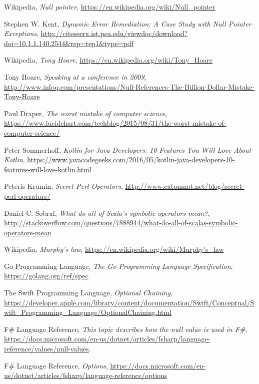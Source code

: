 \documentclass[11pt, a4paper]{report}
\begin{document}
\listoffigures

\begin{thebibliography}{100}
	
    Wikipedia,
    \emph{Null pointer},
    \url{https://en.wikipedia.org/wiki/Null_pointer}

    Stephen W. Kent,
    \textit{Dynamic Error Remediation: A Case Study with Null Pointer Exceptions},
    \url{http://citeseerx.ist.psu.edu/viewdoc/download?doi=10.1.1.140.2544&rep=rep1&type=pdf}

    Wikipedia,
    \textit{Tony Hoare},
    \url{https://en.wikipedia.org/wiki/Tony_Hoare}
    
    Tony Hoare,
    \textit{Speaking at a conference in 2009},
    \url{http://www.infoq.com/presentations/Null-References-The-Billion-Dollar-Mistake-Tony-Hoare}

    Paul Draper,
    \textit{The worst mistake of computer science},
    \url{https://www.lucidchart.com/techblog/2015/08/31/the-worst-mistake-of-computer-science/}

 	Peter Sommerhoff,
 	\textit{Kotlin for Java Developers: 10 Features You Will Love About Kotlin},
 	\url{https://www.javacodegeeks.com/2016/05/kotlin-java-developers-10-features-will-love-kotlin.html}

    Peteris Krumin,
    \textit{Secret Perl Operators},
    \url{http://www.catonmat.net/blog/secret-perl-operators/}

    Daniel C. Sobral,
    \textit{What do all of Scala's symbolic operators mean?},
    \url{http://stackoverflow.com/questions/7888944/what-do-all-of-scalas-symbolic-operators-mean}
    
    Wikipedia,
    \textit{Murphy's law},
    \url{https://en.wikipedia.org/wiki/Murphy's_law}

    Go Programming Language,
    \textit{The Go Programming Language Specification},
    \url{https://golang.org/ref/spec}

    The Swift Programming Language,
    \textit{Optional Chaining},
    \url{https://developer.apple.com/library/content/documentation/Swift/Conceptual/Swift_Programming_Language/OptionalChaining.html}
    
    F\# Language Reference,
    \textit{This topic describes how the null value is used in F\#},
    \url{https://docs.microsoft.com/en-us/dotnet/articles/fsharp/language-reference/values/null-values}.

    F\# Language Reference,
    \textit{Options},
    \url{https://docs.microsoft.com/en-us/dotnet/articles/fsharp/language-reference/options}

\end{thebibliography}
\end{document}
